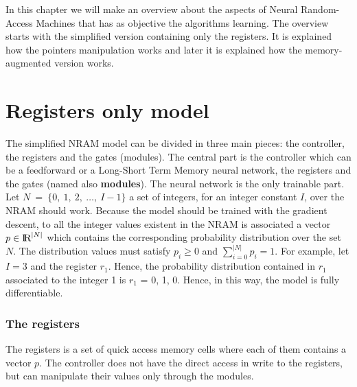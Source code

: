 In this chapter we will make an overview about the aspects of Neural Random-Access Machines \cite{NRAM:2016} that has as objective the algorithms learning. The overview starts with the simplified version containing only the registers. It is explained how the pointers manipulation works and later it is explained how the memory-augmented version works.

\section{Registers only model}
The simplified NRAM model can be divided in three main pieces: the controller, the registers and the gates (modules). The central part is the controller which can be a feedforward or a Long-Short Term Memory neural network, the registers and the gates (named also \textbf{modules}). The neural network is the only trainable part. \newline \newline 
Let $N\ =\ \{0,\ 1,\ 2,\ \dots,\ I - 1\}$ a set of integers, for an integer constant $I$, over the NRAM should work. Because the model should be trained with the gradient descent, to all the integer values existent in the NRAM is associated a vector $p \in \textrm{I\!R}^{|N|}$ which contains the corresponding probability distribution over the set $N$. The distribution values must satisfy $p_{i} \geq 0$ and $\sum\limits_{i = 0}^{|N|} p_{i} = 1$. For example, let $I = 3$ and the register $r_1$. Hence, the probability distribution contained in $r_1$ associated to the integer 1 is $r_1$ = {0, 1, 0}. Hence, in this way, the model is fully differentiable.

\subsubsection*{The registers}
The registers is a set of quick access memory cells where each of them contains a vector $p$. The controller does not have the direct access in write to the registers, but can manipulate their values only through the modules.

